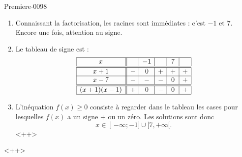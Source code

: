 
\begin{corrige}{Premiere-0098}

    \begin{enumerate}
        \item
            Connaissant la factorisation, les racines sont immédiates : c'est \( -1\) et \( 7\). Encore une fois, attention au signe.
        \item
            Le tableau de signe est :
            \begin{equation*}
                \begin{array}[]{|c||c|c|c|c|c|}
                    \hline
                    x&&-1&&7&\\
                    \hline\hline
                    x+1&-&0&+&+&+\\
                    \hline
                    x-7&-&-&-&0&+\\
                    \hline\hline
                    (x+1)(x-1)&+&0&-&0&+\\
                    \hline
                \end{array}
            \end{equation*}
        \item
            L'inéquation \( f(x)\geq 0\) consiste à regarder dans le tableau les cases pour lesquelles \( f(x)\) a un signe \( +\) ou un zéro. Les solutions sont donc
            \begin{equation}
                x\in\mathopen] -\infty ; -1 \mathclose]\cup\mathopen[ 7 , +\infty [.
            \end{equation}
            <++>
    \end{enumerate}
    <++>

\end{corrige}
